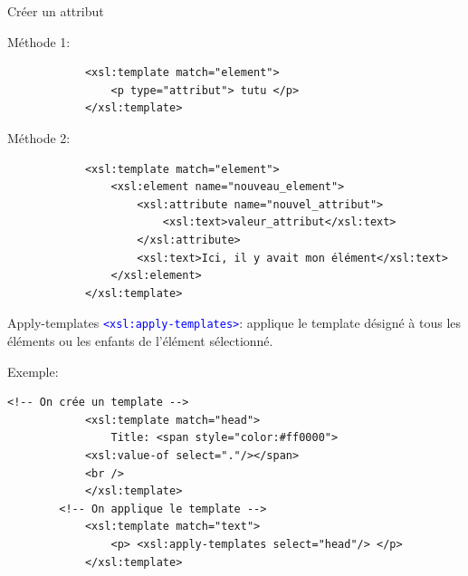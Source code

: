 \begin{frame}[fragile]{Créer un attribut}
\begin{block}{Méthode 1:}
    \begin{lstlisting}
            <xsl:template match="element">
                <p type="attribut"> tutu </p>
            </xsl:template>
        \end{lstlisting}
\end{block}

\begin{block}{Méthode 2:}
    \begin{lstlisting}
            <xsl:template match="element">
                <xsl:element name="nouveau_element">
                    <xsl:attribute name="nouvel_attribut">
                        <xsl:text>valeur_attribut</xsl:text>
                    </xsl:attribute>
                    <xsl:text>Ici, il y avait mon élément</xsl:text>
                </xsl:element>
            </xsl:template>
        \end{lstlisting}
\end{block}
\end{frame}

\begin{frame}[fragile]{Apply-templates}
    \textcolor{blue}{\texttt{<xsl:apply-templates>}}: applique le template désigné à tous les éléments ou les enfants de l'élément sélectionné.
    \begin{block}{Exemple:}
        \begin{lstlisting}[numbers=none]
        <!-- On crée un template -->
            <xsl:template match="head">
                Title: <span style="color:#ff0000">
            <xsl:value-of select="."/></span>
            <br />
            </xsl:template>
        <!-- On applique le template -->
            <xsl:template match="text">
                <p> <xsl:apply-templates select="head"/> </p>
            </xsl:template>
        \end{lstlisting}
    \end{block}
\end{frame}